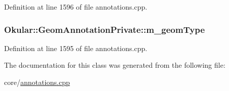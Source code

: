 Definition at line 1596 of file annotations.\+cpp.

\hypertarget{classOkular_1_1GeomAnnotationPrivate_a7a900a31ed0362b56d5e2172df3229dd}{
\subsubsection[{m\+\_\+geom\+Type}]{ Okular\+::\+Geom\+Annotation\+Private\+::m\+\_\+geom\+Type}}\label{classOkular_1_1GeomAnnotationPrivate_a7a900a31ed0362b56d5e2172df3229dd}


Definition at line 1595 of file annotations.\+cpp.



The documentation for this class was generated from the following file\+:\begin{DoxyCompactItemize}
\item 
core/\hyperlink{annotations_8cpp}{annotations.\+cpp}\end{DoxyCompactItemize}
